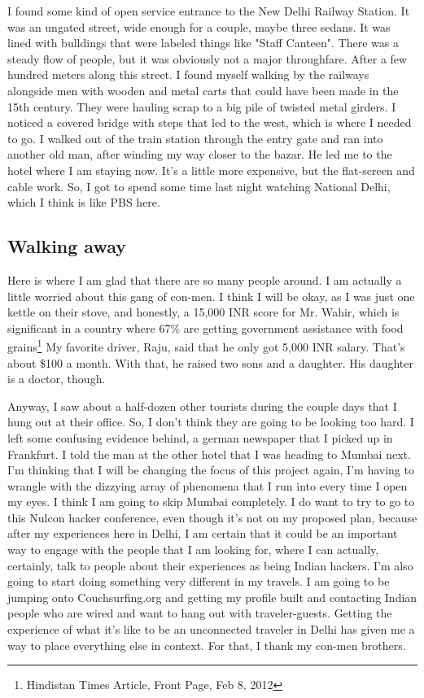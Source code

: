 \documentclass[11pt]{amsart}
\begin{document}
I found some kind of open service entrance to the New Delhi Railway Station. It was an ungated street, wide enough for a couple, maybe three sedans. It was lined with bulldings that were labeled things like "Staff Canteen". There was a steady flow of people, but it was obviously not a major throughfare. After a few hundred meters along this street. I found myself walking by the railways alongside men with wooden and metal carts that could have been made in the 15th century. They were hauling scrap to a big pile of twisted metal girders. I noticed a covered bridge with steps that led to the west, which is where I needed to go. I walked out of the train station through the entry gate and ran into another old man, after winding my way closer to the bazar. He led me to the hotel where I am staying now. It's a little more expensive, but the flat-screen and cable work. So, I got to spend some time last night watching National Delhi, which I think is like PBS here.

\subsection{Walking away}

Here is where I am glad that there are so many people around. I am actually a little worried about this gang of con-men. I think I will be okay, as I was just one kettle on their stove, and honestly, a 15,000 INR score for Mr. Wahir, which is significant in a country where 67\% are getting government assistance with food grains\footnote{Hindistan Times Article, Front Page, Feb 8, 2012} My favorite driver, Raju, said that he only got 5,000 INR salary. That's about \$100 a month. With that, he raised two sons and a daughter. His daughter is a doctor, though.

Anyway, I saw about a half-dozen other tourists during the couple days that I hung out at their office. So, I don't think they are going to be looking too hard. I left some confusing evidence behind, a german newspaper that I picked up in Frankfurt.  I told the man at the other hotel that I was heading to Mumbai next. I'm thinking that I will be changing the focus of this project again, I'm having to wrangle with the dizzying array of phenomena that I run into every time I open my eyes. I think I am going to skip Mumbai completely. I do want to try to go to this Nulcon hacker conference, even though it's not on my proposed plan, because after my experiences here in Delhi, I am certain that it could be an important way to engage with the people that I am looking for, where I can actually, certainly, talk to people about their experiences as being Indian hackers. I'm also going to start doing something very different in my travels. I am going to be jumping onto Couchsurfing.org and getting my profile built and contacting Indian people who are wired and want to hang out with traveler-guests. Getting the experience of what it's like to be an unconnected traveler in Delhi has given me a way to place everything else in context. For that, I thank my con-men brothers. 
\end{document}
